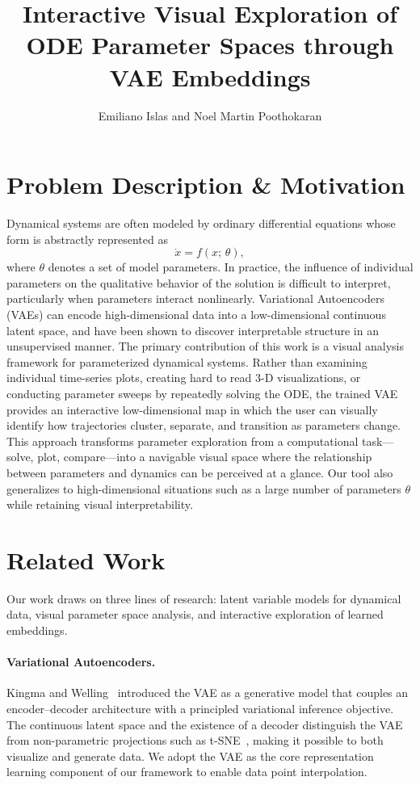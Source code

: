 \documentclass{article}
\title{Interactive Visual Exploration of ODE Parameter Spaces through VAE Embeddings}
\author{Emiliano Islas and Noel Martin Poothokaran}
\begin{document}
\maketitle


\section{Problem Description \& Motivation}


Dynamical systems are often modeled by ordinary differential equations whose
form is abstractly represented as
\begin{equation}
    \dot{x} = f(x;\,\theta),
\end{equation}
where $\theta$ denotes a set of model parameters. In practice, the influence
of individual parameters on the qualitative behavior of the solution is
difficult to interpret, particularly when parameters interact nonlinearly.
Variational Autoencoders (VAEs) can encode high-dimensional data into a
low-dimensional continuous latent space, and have been shown to discover
interpretable structure in an unsupervised manner. 
\vspace{10px}
The primary contribution of this work is a visual analysis framework
for parameterized dynamical systems. Rather than examining individual
time-series plots, creating hard to read 3-D visualizations, or conducting parameter sweeps by repeatedly solving the ODE,
the trained VAE provides an interactive low-dimensional map in which the user
can visually identify how trajectories cluster, separate, and transition as
parameters change. This approach transforms parameter exploration from a
computational task---solve, plot, compare---into a navigable visual space where
the relationship between parameters and dynamics can be perceived at a glance. Our tool also generalizes to high-dimensional situations such as a large number of parameters $\theta$ while retaining visual interpretability.

\section{Related Work}

Our work draws on three lines of research: latent variable models for
dynamical data, visual parameter space analysis, and interactive exploration of
learned embeddings.

\paragraph{Variational Autoencoders.}
Kingma and Welling~\cite{kingma2014auto} introduced the VAE as a generative
model that couples an encoder--decoder architecture with a principled
variational inference objective. The continuous latent space and the existence
of a decoder distinguish the VAE from non-parametric projections such as
t-SNE~\cite{vandermaaten2008visualizing}, making it possible to both visualize
and generate data. We adopt the VAE as the core representation learning
component of our framework to enable data point interpolation.
\end{document}
